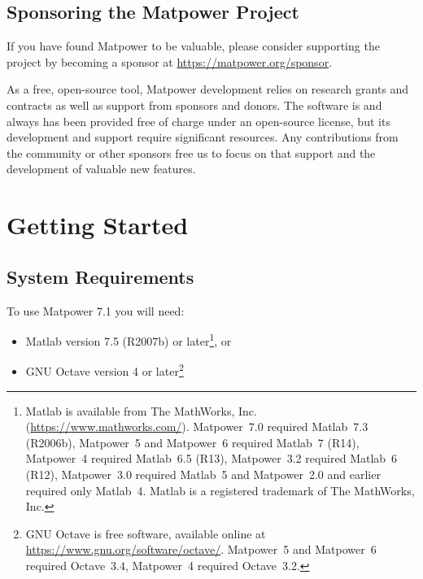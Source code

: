 \documentclass[12pt]{article}
\newcommand{\mpver}[0]{7.1}
\newcommand{\matlab}[0]{{\sc Matlab}}
\newcommand{\matpower}[0]{{\sc Matpower}}
\numberwithin{equation}{section}
\numberwithin{table}{section}
\numberwithin{figure}{section}
\begin{document}
\subsection{Sponsoring the \matpower{} Project}
\label{sec:sponsor}

If you have found \matpower{} to be valuable, please consider supporting the project by becoming a sponsor at \url{https://matpower.org/sponsor}.

As a free, open-source tool, \matpower{} development relies on research grants and contracts as well as support from sponsors and donors. The software is and always has been provided free of charge under an open-source license, but its development and support require significant resources. Any contributions from the community or other sponsors free us to focus on that support and the development of valuable new features.

\clearpage
\section{Getting Started}


\subsection{System Requirements}
\label{sec:sysreq}
To use \matpower{} \mpver{} you will need:
\begin{itemize}
\item \matlab{}\textsuperscript{\tiny \textregistered} version 7.5 (R2007b) or later\footnote{\matlab{} is available from The MathWorks, Inc. (\url{https://www.mathworks.com/}). \matpower{}~7.0 required \matlab{}~7.3 (R2006b), \matpower{}~5 and \matpower{}~6 required \matlab{}~7 (R14), \matpower{}~4 required \matlab{}~6.5 (R13), \matpower{}~3.2 required \matlab{}~6 (R12), \matpower{}~3.0 required \matlab{}~5 and \matpower{}~2.0 and earlier required only \matlab{}~4. \matlab{} is a registered trademark of The MathWorks, Inc.}, or
\item GNU Octave version 4 or later\footnote{GNU Octave \cite{octave} is free software, available online at \url{https://www.gnu.org/software/octave/}. \matpower{}~5 and \matpower{}~6 required Octave~3.4, \matpower{}~4 required Octave~3.2.}
\end{itemize}
\end{document}
